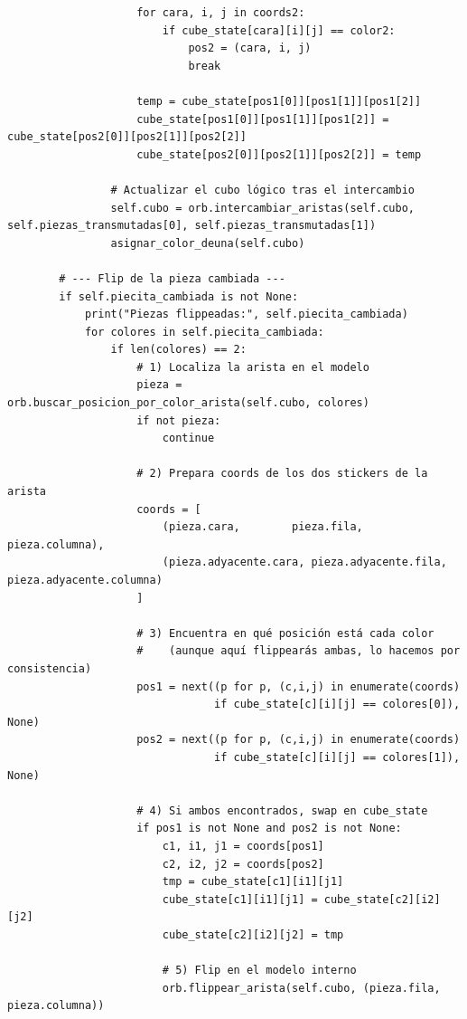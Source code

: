 \begin{lstlisting}
                    for cara, i, j in coords2:
                        if cube_state[cara][i][j] == color2:
                            pos2 = (cara, i, j)
                            break

                    temp = cube_state[pos1[0]][pos1[1]][pos1[2]]
                    cube_state[pos1[0]][pos1[1]][pos1[2]] = cube_state[pos2[0]][pos2[1]][pos2[2]]
                    cube_state[pos2[0]][pos2[1]][pos2[2]] = temp

                # Actualizar el cubo lógico tras el intercambio
                self.cubo = orb.intercambiar_aristas(self.cubo, self.piezas_transmutadas[0], self.piezas_transmutadas[1])
                asignar_color_deuna(self.cubo)
                    
        # --- Flip de la pieza cambiada ---
        if self.piecita_cambiada is not None:
            print("Piezas flippeadas:", self.piecita_cambiada)
            for colores in self.piecita_cambiada:
                if len(colores) == 2:
                    # 1) Localiza la arista en el modelo
                    pieza = orb.buscar_posicion_por_color_arista(self.cubo, colores)
                    if not pieza:
                        continue

                    # 2) Prepara coords de los dos stickers de la arista
                    coords = [
                        (pieza.cara,        pieza.fila,        pieza.columna),
                        (pieza.adyacente.cara, pieza.adyacente.fila, pieza.adyacente.columna)
                    ]

                    # 3) Encuentra en qué posición está cada color
                    #    (aunque aquí flippearás ambas, lo hacemos por consistencia)
                    pos1 = next((p for p, (c,i,j) in enumerate(coords)
                                if cube_state[c][i][j] == colores[0]), None)
                    pos2 = next((p for p, (c,i,j) in enumerate(coords)
                                if cube_state[c][i][j] == colores[1]), None)

                    # 4) Si ambos encontrados, swap en cube_state
                    if pos1 is not None and pos2 is not None:
                        c1, i1, j1 = coords[pos1]
                        c2, i2, j2 = coords[pos2]
                        tmp = cube_state[c1][i1][j1]
                        cube_state[c1][i1][j1] = cube_state[c2][i2][j2]
                        cube_state[c2][i2][j2] = tmp

                        # 5) Flip en el modelo interno
                        orb.flippear_arista(self.cubo, (pieza.fila, pieza.columna))


\end{lstlisting}
